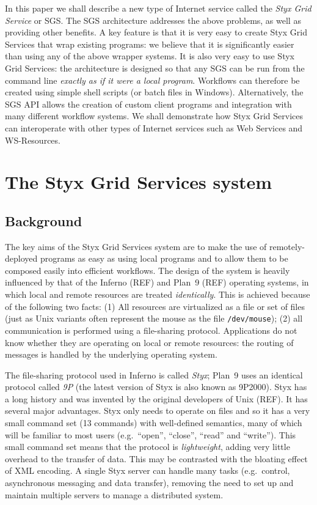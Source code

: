 \documentclass{llncs}
\begin{document}
In this paper we shall describe a new type of Internet service called the {\em Styx Grid Service\/} or SGS.  The SGS architecture addresses the above problems, as well as providing other benefits.  A key feature is that it is very easy to create Styx Grid Services that wrap existing programs: we believe that it is significantly easier than using any of the above wrapper systems.  It is also very easy to use Styx Grid Services: the architecture is designed so that any SGS can be run from the command line {\em exactly as if it were a local program\/}.  Workflows can therefore be created using simple shell scripts (or batch files in Windows).  Alternatively, the SGS API allows the creation of custom client programs and integration with many different workflow systems.  We shall demonstrate how Styx Grid Services can interoperate with other types of Internet services such as Web Services and WS-Resources.

%
\section{The Styx Grid Services system}
\subsection{Background}
The key aims of the Styx Grid Services system are to make the use of remotely-deployed programs as easy as using local programs and to allow them to be composed easily into efficient workflows.  The design of the system is heavily influenced by that of the Inferno (REF) and Plan~9 (REF) operating systems, in which local and remote resources are treated {\em identically\/}.  This is achieved because of the following two facts: (1) All resources are virtualized as a file or set of files (just as Unix variants often represent the mouse as the file {\tt /dev/mouse}); (2) all communication is performed using a file-sharing protocol.  Applications do not know whether they are operating on local or remote resources: the routing of messages is handled by the underlying operating system.

The file-sharing protocol used in Inferno is called {\em Styx\/}; Plan~9 uses an identical protocol called {\em 9P\/} (the latest version of Styx is also known as 9P2000).  Styx has a long history and was invented by the original developers of Unix (REF).  It has several major advantages.  Styx only needs to operate on files and so it has a very small command set (13 commands) with well-defined semantics, many of which will be familiar to most users (e.g.\ ``open'', ``close'', ``read'' and ``write'').  This small command set means that the protocol is {\em lightweight\/}, adding very little overhead to the transfer of data.  This may be contrasted with the bloating effect of XML encoding.  A single Styx server can handle many tasks (e.g.\ control, asynchronous messaging and data transfer), removing the need to set up and maintain multiple servers to manage a distributed system.
\end{document}
